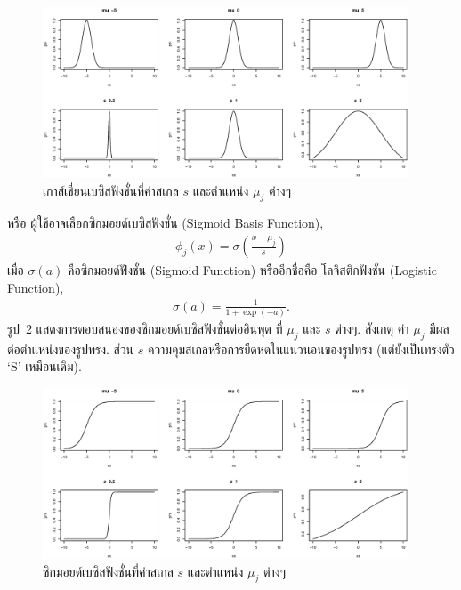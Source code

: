 %
\begin{figure}
\begin{center}
\includegraphics[height=2in]{02Background/gaussianBasis.eps}
\end{center}
\caption{เกาส์เชี่ยนเบซิสฟังชั่นที่ค่าสเกล $s$ และตำแหน่ง $\mu_j$ ต่างๆ}
\label{fig: gaussian basis function}
\end{figure}
%

หรือ ผู้ใช้อาจเลือกซิกมอยด์เบซิสฟังชั่น (Sigmoid Basis Function),
\begin{eqnarray}
   \phi_j(x) = \sigma \left( \frac{x - \mu_j}{s} \right)
\label{eq: sigmoid basis function}
\end{eqnarray}
เมื่อ $\sigma(a)$ คือซิกมอยด์ฟังชั่น (Sigmoid Function)
หรืออีกชื่อคือ โลจิสติกฟังชั่น (Logistic Function),
\begin{eqnarray}
   \sigma(a) = \frac{1}{1+\exp(-a)}.
\end{eqnarray}
รูป~\ref{fig: sigmoid basis function} แสดงการตอบสนองของซิกมอยด์เบซิสฟังชั่นต่ออินพุต ที่ $\mu_j$ และ $s$ ต่างๆ.
สังเกตุ ค่า $\mu_j$ มีผลต่อตำแหน่งของรูปทรง.
ส่วน $s$ ความคุมสเกลหรือการยืดหดในแนวนอนของรูปทรง (แต่ยังเป็นทรงตัว `S' เหมือนเดิม).

%
\begin{figure}
\begin{center}
\includegraphics[height=2in]{02Background/sigmoidBasis.eps}
\end{center}
\caption{ซิกมอยด์เบซิสฟังชั่นที่ค่าสเกล $s$ และตำแหน่ง $\mu_j$ ต่างๆ}
\label{fig: sigmoid basis function}
\end{figure}
%

